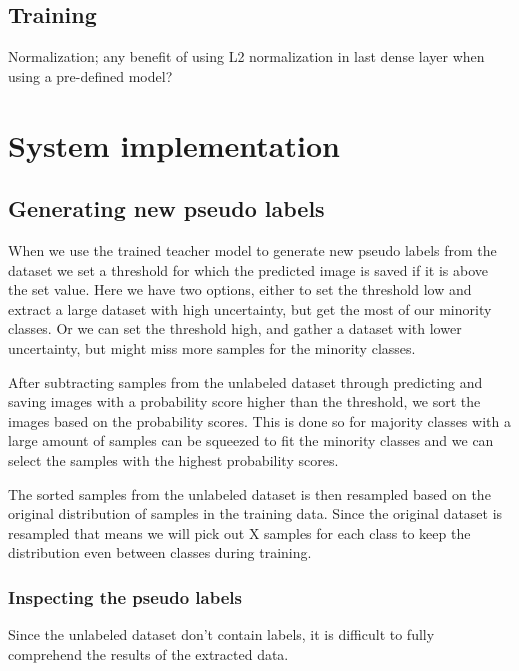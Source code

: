 \documentclass[thesis.tex]{subfiles}
\begin{document}



\subsection{Training}

Normalization; any benefit of using L2 normalization in last dense layer when using a pre-defined model?

\section{System implementation} \label{sec:system_implementation}


\subsection{Generating new pseudo labels}
When we use the trained teacher model to generate new pseudo labels from the dataset we set a threshold for which the predicted image is saved if it is above the set value. Here we have two options, either to set the threshold low and extract a large dataset with high uncertainty, but get the most of our minority classes. Or we can set the threshold high, and gather a dataset with lower uncertainty, but might miss more samples for the minority classes.

After subtracting samples from the unlabeled dataset through predicting and saving images with a probability score higher than the threshold, we sort the images based on the probability scores. This is done so for majority classes with a large amount of samples can be squeezed to fit the minority classes and we can select the samples with the highest probability scores.

The sorted samples from the unlabeled dataset is then resampled based on the original distribution of samples in the training data. Since the original dataset is resampled that means we will pick out X samples for each class to keep the distribution even between classes during training.

\subsubsection{Inspecting the pseudo labels}
Since the unlabeled dataset don't contain labels, it is difficult to fully comprehend the results of the extracted data.
\end{document}
